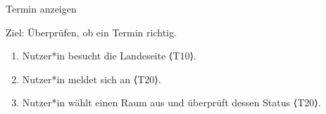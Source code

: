 \begin{scenario}{40}{Termin anzeigen}
  \item[Ziel:] Überprüfen, ob ein Termin richtig.
  \begin{enumerate}
    \item Nutzer*in besucht die Landeseite ⟨T10⟩.
    \item Nutzer*in meldet sich an ⟨T20⟩.
    \item Nutzer*in wählt einen Raum aus und überprüft dessen Status ⟨T20⟩.
  \end{enumerate}
\end{scenario}







